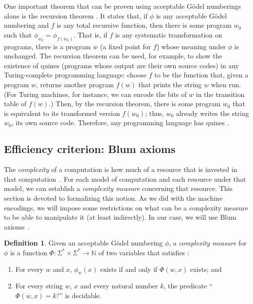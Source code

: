 \documentclass[12pt]{article}
\theoremstyle{definition}
\newtheorem{definition}{Definition}
\begin{document}
One important theorem that can be proven using acceptable Gödel numberings alone
is the recursion theorem
\cite[p.~181]{Rogers1987}.
It states that, if $\phi$ is any acceptable Gödel numbering
and $f$ is any total recursive function,
then there is some program $w_0$ such that $\phi_{w_0} = \phi_{f(w_0)}$.
That is,
if $f$ is any systematic transformation on programs,
there is a program $w$ (a fixed point for $f$) whose meaning under $\phi$ is unchanged.
The recursion theorem can be used,
for example, to show the existence of quines
(programs whose output are their own source codes)
in any Turing-complete programming language:
choose $f$ to be the function that, given a program $w$,
returns another program $f(w)$ that prints the string $w$ when run.
(For Turing machines, for instance,
we can encode the bits of $w$ in the transition table of $f(w)$.)
Then, by the recursion theorem,
there is some program $w_0$ that is equivalent to its transformed version $f(w_0)$;
thus, $w_0$ already writes the string $w_0$, its own source code.
Therefore, any programming language has quines \cite[p.~227]{Kozen2006}.

\subsection{Efficiency criterion: Blum axioms}
\label{sec:blum-axioms}

The \emph{complexity} of a computation is how much of a resource
that is invested in that computation~\cite[p.~285]{HopcroftUllman1979}.
For each model of computation and each resource under that model,
we can establish a \emph{complexity measure} concerning that resource.
This section is devoted to formalizing this notion.
As we did with the machine encodings,
we will impose some restrictions on what can be a complexity measure
to be able to manipulate it (at least indirectly).
In our case,
we will use Blum axioms~\cite[p.~324]{Blum1967}.

\vspace{12pt}
\begin{definition}
    Given an acceptable Gödel numbering $\phi$,
    a \emph{complexity measure} for $\phi$
    is a function $\Phi:\Sigma^* \times \Sigma^* \to \mathbb N$ of two variables
    that satisfies \cite[p.~324]{Blum1967}:
    \begin{enumerate}
        \item For every $w$ and $x$,
            $\phi_w(x)$ exists if and only if $\Phi(w, x)$ exists; and
        \item For every string $w$, $x$ and every natural number $k$,
            the predicate ``$\Phi(w, x) = k$?'' is decidable.
    \end{enumerate}
\end{definition}
\end{document}
